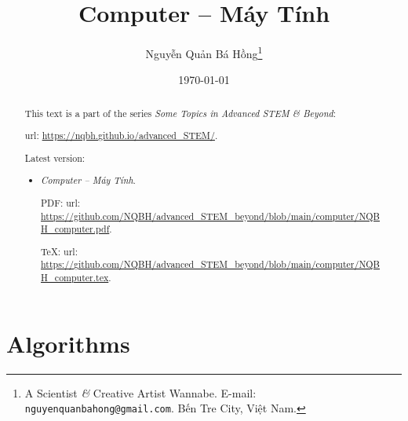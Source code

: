 \documentclass{article}
\title{Computer -- Máy Tính}
\author{Nguyễn Quản Bá Hồng\footnote{A Scientist {\it\&} Creative Artist Wannabe. E-mail: {\tt nguyenquanbahong@gmail.com}. Bến Tre City, Việt Nam.}}
\date{\today}
\begin{document}
\maketitle
\begin{abstract}
	This text is a part of the series {\it Some Topics in Advanced STEM \& Beyond}:
	
	{\sc url}: \url{https://nqbh.github.io/advanced_STEM/}.
	
	Latest version:
	\begin{itemize}
		\item {\it Computer -- Máy Tính}.
		
		PDF: {\sc url}: \url{https://github.com/NQBH/advanced_STEM_beyond/blob/main/computer/NQBH_computer.pdf}.
		
		\TeX: {\sc url}: \url{https://github.com/NQBH/advanced_STEM_beyond/blob/main/computer/NQBH_computer.tex}.
	\end{itemize}
\end{abstract}
\tableofcontents


\section{Algorithms}
\end{document}
